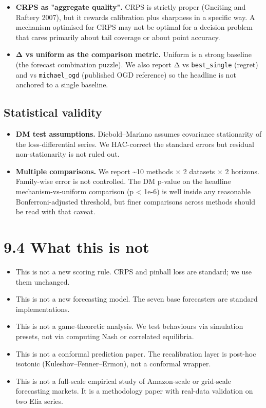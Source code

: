 \documentclass[11pt,a4paper,openany]{report}
\begin{document}
\begin{itemize}
  \item \textbf{CRPS as "aggregate quality".} CRPS is strictly proper (Gneiting
    and Raftery 2007), but it rewards calibration plus sharpness in a
    specific way. A mechanism optimised for CRPS may not be optimal for
    a decision problem that cares primarily about tail coverage or
    about point accuracy.
  \item \textbf{Δ vs uniform as the comparison metric.} Uniform is a strong
    baseline (the forecast combination puzzle). We also report Δ vs
    \texttt{best\_single} (regret) and vs \texttt{michael\_ogd} (published OGD
    reference) so the headline is not anchored to a single baseline.
\end{itemize}

\subsection{Statistical validity}

\begin{itemize}
  \item \textbf{DM test assumptions.} Diebold–Mariano assumes covariance
    stationarity of the loss-differential series. We HAC-correct the
    standard errors but residual non-stationarity is not ruled out.
  \item \textbf{Multiple comparisons.} We report \textasciitilde{}10 methods × 2 datasets × 2
    horizons. Family-wise error is not controlled. The DM p-value on
    the headline mechanism-vs-uniform comparison (p < 1e-6) is well
    inside any reasonable Bonferroni-adjusted threshold, but finer
    comparisons across methods should be read with that caveat.
\end{itemize}

\section{9.4 What this is not}

\begin{itemize}
  \item This is not a new scoring rule. CRPS and pinball loss are
    standard; we use them unchanged.
  \item This is not a new forecasting model. The seven base forecasters
    are standard implementations.
  \item This is not a game-theoretic analysis. We test behaviours via
    simulation presets, not via computing Nash or correlated equilibria.
  \item This is not a conformal prediction paper. The recalibration layer is
    post-hoc isotonic (Kuleshov–Fenner–Ermon), not a conformal wrapper.
  \item This is not a full-scale empirical study of Amazon-scale or
    grid-scale forecasting markets. It is a methodology paper with
    real-data validation on two Elia series.
\end{itemize}
\end{document}
